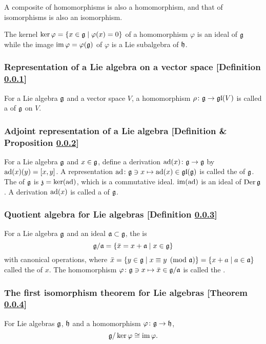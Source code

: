 A composite of homomorphisms is also a homomorphism, and that of isomorphisms is also an isomorphism.

The kernel $\ker \varphi = \{ x \in \mathfrak{g} \mid \varphi(x) = 0 \}$ of a homomorphism $\varphi$ is an ideal of $\mathfrak{g}$ while the image $\operatorname{im} \varphi = \varphi(\mathfrak{g})$ of $\varphi$ is a Lie subalgebra of $\mathfrak{h}$.

\subsubsection{Representation of a Lie algebra on a vector space [Definition \ref{representation-of-a-lie-algebra-on-a-vector-space}]}\label{representation-of-a-lie-algebra-on-a-vector-space}
For a Lie algebra $\mathfrak{g}$ and a vector space $V$, a homomorphism $\rho \colon \mathfrak{g} \to \mathfrak{gl}(V)$ is called a  of $\mathfrak{g}$ on $V$.

\subsubsection{Adjoint representation of a Lie algebra [Definition \& Proposition \ref{adjoint-representation-of-a-lie-algebra}]}\label{adjoint-representation-of-a-lie-algebra}
For a Lie algebra $\mathfrak{g}$ and $x \in \mathfrak{g}$, define a derivation $\operatorname{ad} (x) \colon \mathfrak{g} \to \mathfrak{g}$ by $\operatorname{ad}(x)(y) = [x,y]$. A representation $\operatorname{ad} \colon \mathfrak{g} \ni x \mapsto \operatorname{ad}(x) \in \mathfrak{gl} (\mathfrak{g})$ is called the  of $\mathfrak{g}$. The  of $\mathfrak{g}$ is $\mathfrak{z} = \ker(\operatorname{ad})$, which is a commutative ideal. $\operatorname{im}(\operatorname{ad})$ is an ideal of $\operatorname{Der} \mathfrak{g}$. A derivation $\operatorname{ad}(x)$ is called a  of $\mathfrak{g}$.

\subsubsection{Quotient algebra for Lie algebras [Definition \ref{quotient-algebra-for-lie-algebras}]}\label{quotient-algebra-for-lie-algebras}
For a Lie algebra $\mathfrak{g}$ and an ideal $\mathfrak{a} \subset \mathfrak{g}$, the  is
\[
\mathfrak{g} / \mathfrak{a} = \{ \bar x = x + \mathfrak{a} \mid x \in \mathfrak{g} \}
\]
with canonical operations, where $\bar x = \{ y \in \mathfrak{g} \mid x \equiv y \pmod{\mathfrak{a}} \} = \{ x + a \mid a \in \mathfrak{a} \}$ called the  of $x$. The homomorphism $\varphi \colon \mathfrak{g} \ni x \mapsto \bar x \in \mathfrak{g} / \mathfrak{a}$ is called the .

\subsubsection{The first isomorphism theorem for Lie algebras [Theorem \ref{the-first-isomorphism-theorem-for-lie-algebras}]}\label{the-first-isomorphism-theorem-for-lie-algebras}
For Lie algebras $\mathfrak{g}$, $\mathfrak{h}$ and a homomorphism $\varphi \colon \mathfrak{g} \to \mathfrak{h}$,
\[
\mathfrak{g} / \ker \varphi \cong \operatorname{im} \varphi.
\]

